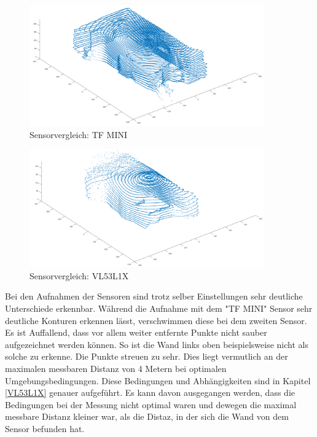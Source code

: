  

\begin{figure}[H]
	\centering
	\includegraphics[width=0.9\textwidth]{images/Validierung/Aufloesungen/mittel.png}
	\caption{Sensorvergleich: TF MINI}
	\label{hoch}
\end{figure}



\begin{figure}[H]
	\centering
	\includegraphics[width=0.9\textwidth]{images/Validierung/VL53.png}
	\caption{Sensorvergleich: VL53L1X}
	\label{vlx}
\end{figure}

Bei den Aufnahmen der Sensoren sind trotz selber Einstellungen sehr deutliche Unterschiede erkennbar. Während die Aufnahme mit dem "TF MINI" Sensor sehr deutliche Konturen erkennen lässt, verschwimmen diese bei dem zweiten Sensor. Es ist Auffallend, dass vor allem weiter entfernte Punkte nicht sauber aufgezeichnet werden können. So ist die Wand links oben beispielsweise nicht als solche zu erkenne. Die Punkte streuen zu sehr. Dies liegt vermutlich an der maximalen messbaren Distanz von 4 Metern bei optimalen Umgebungsbedingungen. Diese Bedingungen und Abhängigkeiten sind in Kapitel \ref{VL53L1X} genauer aufgeführt. Es kann davon ausgegangen werden, dass die Bedingungen bei der Messung nicht optimal waren und dewegen die maximal messbare Distanz kleiner war, als die Distaz, in der sich die Wand von dem Sensor befunden hat. 

